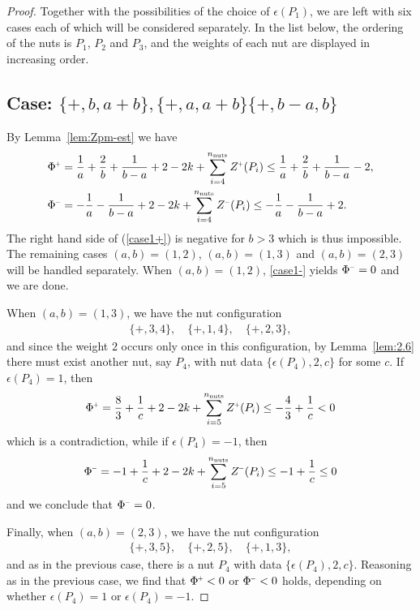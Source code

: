 \documentclass[a4paper,11pt,reqno]{amsart}
\newcommand{\nut}{P}
\theoremstyle{plain}
\newcommand{\nnuts}{n_{\text{\rm nuts}}}
\renewcommand{\P}[1]{{{#1}^{\hspace{-.5pt}\scaleto{+}{4pt}}}}
\newcommand{\M}[1]{{{#1}^{\hspace{-.5pt}\scaleto{-}{4pt}}}}
\numberwithin{equation}{section}
\begin{document}
\begin{proof}
Together with the possibilities of the choice of $\epsilon(\nut_1)$, we are left with six cases each of which will be considered separately. In the list below, the ordering of the nuts is $P_1$, $P_2$ and $P_3$, and the weights of each nut are displayed in increasing order.

\subsection*{Case: $\{+,b,a+b\},\{+,a,a+b\} \{+,b-a ,b\}$}
By Lemma~\ref{lem:Zpm-est} we have
\begin{align} 
\P{\Phi}
&=   
\frac{1}{a}+\frac{2}{b}+\frac{1}{b-a} +2-2k +\sum_{i=4}^{\nnuts}\P{Z}(\nut_i)
\leq 
\frac{1}{a}+\frac{2}{b}+\frac{1}{b-a}-2, \label{case1+}\\
\M{\Phi}
&= 
-\frac{1}{a} -\frac{1}{b-a} +2-2k +\sum_{i=4}^{\nnuts}\M{Z}(\nut_i)
\leq 
-\frac{1}{a} -\frac{1}{b-a} + 2. \label{case1-} 
\end{align}
The right hand side of (\ref{case1+}) is negative for $b>3$ which is thus impossible. The remaining cases $(a,b) =(1,2)$, $(a,b)=(1,3)$ and $(a,b)=(2,3)$ will be handled separately. When $(a,b) = (1,2)$, \eqref{case1-} yields $\M{\Phi} = 0$ and we are done.
 
When $(a,b)=(1,3)$, we have the nut configuration 
\begin{align} 
\{+,3,4\}, \quad \{+,1,4\}, \quad \{+,2,3\}, 
\end{align} 
and since the weight $2$ occurs only once in this configuration, by Lemma~\ref{lem:2.6} there must exist another nut, say $\nut_4$, with nut data $\{\epsilon(\nut_4),2,c\}$ for some $c$. If $\epsilon(\nut_4)=1$, then
\begin{align}
\P{\Phi}
=\frac{8}{3}+\frac{1}{c} +2-2k +\sum_{i=5}^{\nnuts}\P{Z}(\nut_i)
\leq -\frac{4}{3}+\frac{1}{c}
<0
\end{align} 
which is a contradiction, while if $\epsilon(\nut_4)=-1$, then 
\begin{align}
\M{\Phi}
=-1+\frac{1}{c} +2-2k +\sum_{i=5}^{\nnuts}\M{Z}(\nut_i)
\leq-1+\frac{1}{c}
\leq 0
\end{align}
and we conclude that $\M{\Phi} = 0$.

Finally, when $(a,b)=(2,3)$, we have the nut configuration 
\begin{align} 
\{+,3,5\},\quad \{+,2,5\}, \quad \{+,1,3\}, 
\end{align} 
and as in the previous case, there is a nut $\nut_4$ with data $\{\epsilon(\nut_4),2,c\}$. Reasoning as in the previous case, we find that $\P{\Phi} < 0$ or $\M{\Phi} < 0$ holds, depending on whether $\epsilon(\nut_4)=1$ or $\epsilon(\nut_4)=-1$.


\end{proof}
\end{document}
